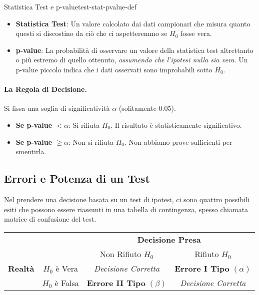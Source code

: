 \begin{definizione}{Statistica Test e p-value}{test-stat-pvalue-def}
	\begin{itemize}
		\item \textbf{Statistica Test}: Un valore calcolato dai dati campionari
		      che misura quanto questi si discostino da ciò che ci aspetteremmo se
		      $H_0$ fosse vera.
		\item \textbf{p-value}: La probabilità di osservare un valore della
		      statistica test altrettanto o più estremo di quello ottenuto,
		      \textit{assumendo che l'ipotesi nulla sia vera}. Un p-value piccolo
		      indica che i dati osservati sono improbabili sotto $H_0$.
	\end{itemize}
\end{definizione}

\paragraph{La Regola di Decisione.} Si fissa una soglia di significatività
$\alpha$ (solitamente 0.05).
\begin{itemize}
	\item \textbf{Se p-value $<\alpha$}: Si rifiuta $H_0$. Il risultato è
	      statisticamente significativo.
	\item \textbf{Se p-value $\geq \alpha$}: Non si rifiuta $H_0$. Non abbiamo
	      prove sufficienti per smentirla.
\end{itemize}

\subsection{Errori e Potenza di un Test}

Nel prendere una decisione basata su un test di ipotesi, ci sono quattro
possibili esiti che possono essere riassunti in una tabella di contingenza,
spesso chiamata matrice di confusione del test.

\begin{center}
	\begin{tabular}{cc|c|c|}
		                & \multicolumn{1}{c}{}              &
		\multicolumn{2}{c}{\textbf{Decisione Presa}}                                              \\
		                & \multicolumn{1}{c}{}              & \multicolumn{1}{c}{Non Rifiuto
		$H_0$}          & \multicolumn{1}{c}{Rifiuto $H_0$}                                       \\
		\cline{3-4}
		\textbf{Realtà} & $H_0$ è Vera                      & \textit{Decisione Corretta}       &
		\textbf{Errore I Tipo} $(\alpha)$                                                         \\
		\cline{3-4}
		                & $H_0$ è Falsa                     & \textbf{Errore II Tipo} $(\beta)$ &
		\textit{Decisione Corretta}                                                               \\
		\cline{3-4}
	\end{tabular}
\end{center}

